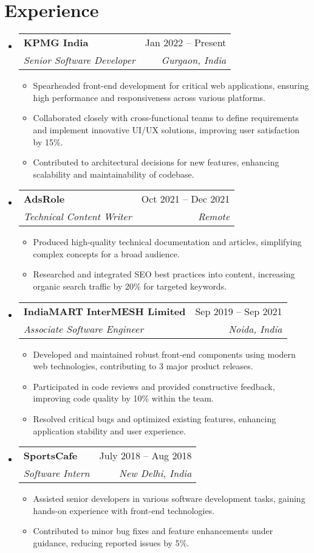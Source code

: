 \documentclass[letterpaper,11pt]{article}
\makeatletter
\newcommand{\resumeSubheading}[4]{
  \vspace{-1pt}\item
    \begin{tabular*}{0.97\textwidth}[t]{l@{\extracolsep{\fill}}r}
      \textbf{#1} & #2 \\
      \textit{\small#3} & \textit{\small #4} \\
    \end{tabular*}\vspace{-5pt}
}
\newcommand{\resumeSubHeadingListStart}{\begin{itemize}[leftmargin=*]}
\newcommand{\resumeSubHeadingListEnd}{\end{itemize}}
\newcommand{\resumeItemListStart}{\begin{itemize}}
\newcommand{\resumeItemListEnd}{\end{itemize}\vspace{-5pt}}
\makeatother
\begin{document}
\section{Experience}
  \resumeSubHeadingListStart
    \resumeSubheading
      {KPMG India}{Jan 2022 -- Present}
      {Senior Software Developer}{Gurgaon, India}
      \resumeItemListStart
        \item \small{Spearheaded front-end development for critical web applications, ensuring high performance and responsiveness across various platforms.}
        \item \small{Collaborated closely with cross-functional teams to define requirements and implement innovative UI/UX solutions, improving user satisfaction by 15\%.}
        \item \small{Contributed to architectural decisions for new features, enhancing scalability and maintainability of codebase.}
      \resumeItemListEnd
    \resumeSubheading
      {AdsRole}{Oct 2021 -- Dec 2021}
      {Technical Content Writer}{Remote}
      \resumeItemListStart
        \item \small{Produced high-quality technical documentation and articles, simplifying complex concepts for a broad audience.}
        \item \small{Researched and integrated SEO best practices into content, increasing organic search traffic by 20\% for targeted keywords.}
      \resumeItemListEnd
    \resumeSubheading
      {IndiaMART InterMESH Limited}{Sep 2019 -- Sep 2021}
      {Associate Software Engineer}{Noida, India}
      \resumeItemListStart
        \item \small{Developed and maintained robust front-end components using modern web technologies, contributing to 3 major product releases.}
        \item \small{Participated in code reviews and provided constructive feedback, improving code quality by 10\% within the team.}
        \item \small{Resolved critical bugs and optimized existing features, enhancing application stability and user experience.}
      \resumeItemListEnd
    \resumeSubheading
      {SportsCafe}{July 2018 -- Aug 2018}
      {Software Intern}{New Delhi, India}
      \resumeItemListStart
        \item \small{Assisted senior developers in various software development tasks, gaining hands-on experience with front-end technologies.}
        \item \small{Contributed to minor bug fixes and feature enhancements under guidance, reducing reported issues by 5\%.}
      \resumeItemListEnd
  \resumeSubHeadingListEnd
\end{document}
